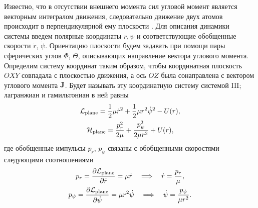 Известно, что в отсутствии внешнего момента сил угловой момент является векторным интегралом движения, следовательно движение двух атомов происходит в перпендикулярной ему плоскости \cite{goldstein}. Для описания динамики системы введем полярные координаты $r, \psi$ и соответствующие обобщенные скорости $\dot{r}$, $\dot{\psi}$. Ориентацию плоскости будем задавать при помощи пары сферических углов $\Phi$, $\Theta$, описывающих направление вектора углового момента. Определим систему координат таким образом, чтобы координатная плоскость $OXY$ совпадала с плоскостью движения, а ось $OZ$ была сонаправлена с вектором углового момента $\mathbf{J}$. Будет называть эту координатную систему системой III; лагранжиан и гамильтониан в ней равны 
\begin{gather}
    \mathcal{L}_\text{plane} = \frac{1}{2} \mu \dot{r}^2 + \frac{1}{2} \mu r^2 \dot{\psi}^2 - U(r), \label{two-atom-plane-lagrangian} \\
    \mathcal{H}_\text{plane} = \frac{p_r^2}{2\mu} + \frac{p_\psi^2}{2 \mu r^2} + U(r), \label{two-atom-plane-hamiltonian} 
\end{gather}
%
где обобщенные импульсы $p_r$, $p_\psi$ связаны с обобщенными скоростями следующими соотношениями
\begin{gather}
    p_r = \frac{\partial \mathcal{L}_\text{plane}}{\partial \dot{r}} = \mu \dot{r} \quad \Longrightarrow \quad \dot{r} = \frac{p_r}{\mu}, \label{two-atom-plane-momenta1} \\
    p_\psi = \frac{\partial \mathcal{L}_\text{plane}}{\partial \dot{\psi}} = \mu r^2 \dot{\psi} \quad \Longrightarrow \quad \dot{\psi} = \frac{p_\psi}{\mu r^2}.  \label{two-atom-plane-momenta2}
\end{gather}

